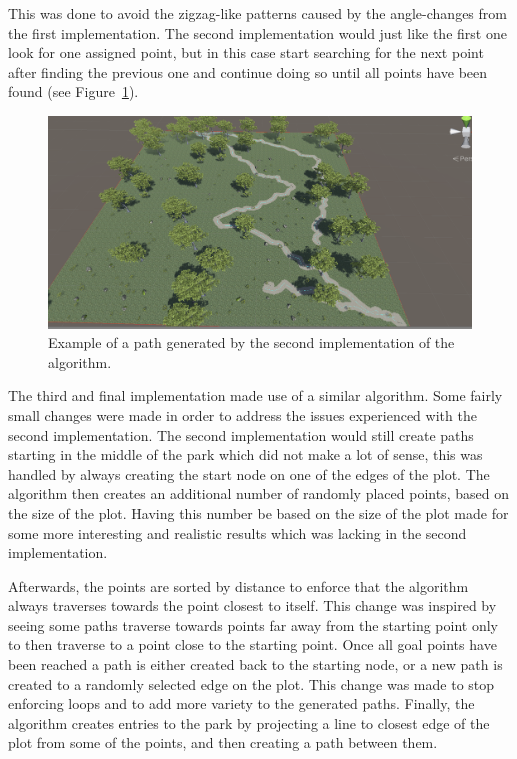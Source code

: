 This was done to avoid the zigzag-like patterns caused by the angle-changes from the first implementation.
The second implementation would just like the first one look for one assigned point, but in this case start searching for the next point after finding the previous one and continue doing so until all points have been found (see Figure~\ref{fig:texsplat}). 
\begin{figure}[H]
\includegraphics[width=\linewidth]{figure/texturesplat}
\caption{Example of a path generated by the second implementation of the algorithm.}
\label{fig:texsplat}
\end{figure}
The third and final implementation made use of a similar algorithm.
Some fairly small changes were made in order to address the issues experienced with the second implementation.
The second implementation would still create paths starting in the middle of the park which did not make a lot of sense, this was handled by always creating the start node on one of the edges of the plot.
The algorithm then creates an additional number of randomly placed points, based on the size of the plot.
Having this number be based on the size of the plot made for some more interesting and realistic results which was lacking in the second implementation.

Afterwards, the points are sorted by distance to enforce that the algorithm always traverses towards the point closest to itself. 
This change was inspired by seeing some paths traverse towards points far away from the starting point only to then traverse to a point close to the starting point.
Once all goal points have been reached a path is either created back to the starting node, or a new path is created to a randomly selected edge on the plot. 
This change was made to stop enforcing loops and to add more variety to the generated paths.
Finally, the algorithm creates entries to the park by projecting a line to closest edge of the plot from some of the points, and then creating a path between them. 
 
